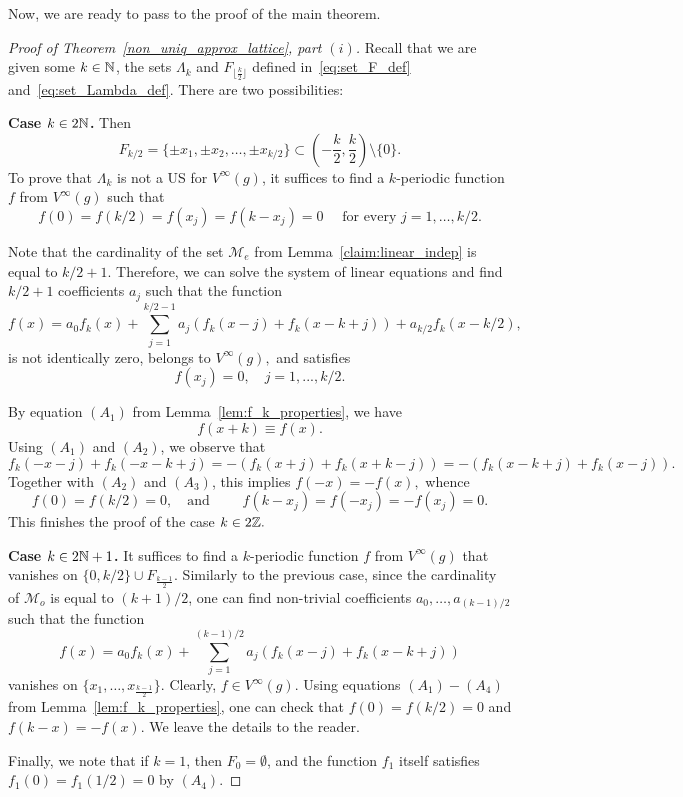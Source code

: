 \documentclass[10pt,a4paper]{amsart}
\numberwithin{equation}{section}
\begin{document}
Now, we are ready to pass to the proof of the main theorem. 

\begin{proof}[Proof of Theorem~\ref{non_uniq_approx_lattice}, part $(i)$]
Recall that we are given some $k \in {\mathbb N}$, the sets $\Lambda_k$ and $F_{\lfloor\frac{k}{2}\rfloor}$ defined in~\eqref{eq:set_F_def} and~\eqref{eq:set_Lambda_def}. 
There are two possibilities:

{\bf Case $k \in 2{\mathbb N}$.} Then $$F_{k/2}  =\{\pm x_1, \pm x_2, \dots, \pm x_{k/2}\} \subset \left(-\frac{k}{2},\frac{k}{2}\right) \setminus \{0\}.$$
To prove that $\Lambda_k$ is not a US for $V^{\infty}(g)$, it suffices to find a $k$-periodic function $f$ from $V^{\infty}(g)$ such that
$$f(0) = f(k/2) = f(x_j) = f(k-x_j) = 0 \quad \text{ for every } j = 1, \dots, k/2.$$

Note that the cardinality of the set $\mathcal{M}_e$ from Lemma~\ref{claim:linear_indep} is equal to $k/2+1.$
Therefore, we can solve the system of linear equations and find $k/2+1$ coefficients $a_j$ such that the function 
\begin{equation}\label{eq:f_def_aj}
  f(x)=a_0 f_k(x)+\sum_{j=1}^{k/2-1}a_j(f_k(x-j)+f_k(x-k+j))+a_{k/2}f_{k}(x-k/2),  
\end{equation}
is not identically zero, belongs to $V^{\infty}(g),$ and satisfies
\begin{equation}\label{eq:f_vanishes_F}
    f(x_j)=0, \quad j=1,...,k/2.
\end{equation}

By equation $(A_1)$ from Lemma~\ref{lem:f_k_properties},  we have \begin{equation}\label{eq:f_is_k_periodic}
 f(x+k)\equiv f(x).   
\end{equation} 
Using $(A_1)$ and $(A_2)$, we observe that
$$f_k(-x-j)+f_k(-x-k+j)=-(f_k(x+j)+f_k(x+k-j))=-(f_k(x-k+j)+f_k(x-j)).$$ Together with $(A_2)$ and $(A_3)$, this implies $f(-x)=-f(x),$ whence
\begin{equation}
    f(0)=f(k/2)=0, \quad \text{and } \quad  \quad f(k-x_j) =f(-x_j) = - f(x_j) = 0. 
\end{equation}
This finishes the proof of the case $k \in 2{\mathbb Z}.$

{\bf Case $k \in 2{\mathbb N}+1$.}  It suffices to find a $k$-periodic function $f$ from $V^\infty(g)$ that vanishes on $\{0, k/2\} \cup F_{\frac{k-1}{2}}.$ Similarly to the previous case, since the cardinality of $\mathcal{M}_o$ is equal to $(k+1)/2$, one can find non-trivial coefficients $a_0, \dots, a_{(k-1)/2}$ such that the function 
$$f(x)=a_0 f_k(x)+\sum_{j=1}^{(k-1)/2}a_j(f_k(x-j)+f_k(x-k+j))$$ vanishes on $\{x_1, \dots, x_{\frac{k-1}{2}}\}.$ Clearly, $f\in V^{\infty}(g).$
Using equations $(A_1)-(A_4)$ from Lemma~\ref{lem:f_k_properties}, one can check that $f(0)=f(k/2)=0$ and $f(k-x)=-f(x).$
We leave the details to the reader.

Finally, we note that if $k=1$, then $F_0=\emptyset$, and the function $f_1$ itself satisfies
$f_1(0)=f_1(1/2)=0$ by $(A_4)$. 
\end{proof}
\end{document}
